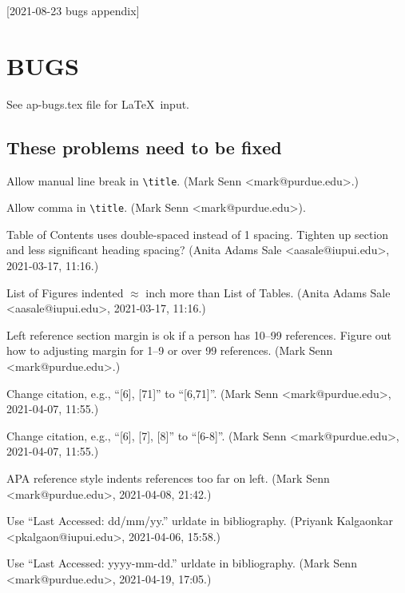 [2021-08-23 bugs appendix]

\newcommand{\bug}{\vspace{6pt}}  
\newcommand{\checkedok}[1]{{\bfseries Checked ok on #1.}}
\newcommand{\waitingon}[1]{{\bfseries Waiting on #1.}}

\chapter{BUGS}

See ap-bugs.tex file for \LaTeX\ input.


\section{These problems need to be fixed}


\bug
Allow manual line break in \verb+\title+.
{\small (Mark Senn <mark@purdue.edu>.)}

\bug
Allow comma in \verb+\title+.
{\small (Mark Senn <mark@purdue.edu>).}

\bug
Table of Contents uses double-spaced instead of 1 spacing.
Tighten up section and less significant heading spacing?
{\small (Anita Adams Sale <aasale@iupui.edu>, 2021-03-17, 11:16.)}
 
\bug
List of Figures indented $\approx$ inch
more than List of Tables.
{\small (Anita Adams Sale <aasale@iupui.edu>, 2021-03-17, 11:16.)}

\bug
Left reference section margin is ok if a person has 10--99 references.
Figure out how to adjusting margin for 1--9 or over 99 references.
{\small (Mark Senn <mark@purdue.edu>.)}

\bug
Change citation, e.g., ``[6], [71]'' to ``[6,71]''.
{\small (Mark Senn <mark@purdue.edu>, 2021-04-07, 11:55.)}

\bug
Change citation, e.g., ``[6], [7], [8]'' to ``[6-8]''.
{\small (Mark Senn <mark@purdue.edu>, 2021-04-07, 11:55.)}

\bug
APA reference style indents references too far on left.
{\small (Mark Senn <mark@purdue.edu>, 2021-04-08, 21:42.)}

\bug
Use ``Last Accessed: dd/mm/yy.'' urldate in bibliography.
{\small (Priyank Kalgaonkar <pkalgaon@iupui.edu>, 2021-04-06, 15:58.)}

\bug
Use ``Last Accessed: yyyy-mm-dd.'' urldate in bibliography.
{\small (Mark Senn <mark@purdue.edu>, 2021-04-19, 17:05.)}

